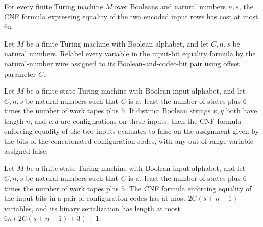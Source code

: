 \begin{theorem}
\label{Complexity.codecInputEquality_cost}
\leanok
{}
For every finite Turing machine $M$ over Booleans and natural numbers $n,s$, the CNF
formula expressing equality of the two encoded input rows has cost at most $6n$.
\end{theorem}

\begin{definition}
\label{Complexity.configurationInputEquality}
\leanok
{}
Let $M$ be a finite Turing machine with Boolean alphabet, and let $C,n,s$ be natural
numbers. Relabel every variable in the input-bit equality formula by the natural-number
wire assigned to its Boolean-and-codec-bit pair using offset parameter $C$.
\end{definition}

\begin{theorem}
\label{Complexity.configurationInputEquality_reject}
\leanok
{}
Let $M$ be a finite-state Turing machine with Boolean input alphabet, and let $C,n,s$ be
natural numbers such that $C$ is at least the number of states plus $6$ times the number
of work tapes plus $5$. If distinct Boolean strings $x,y$ both have length $n$, and
$c,d$ are configurations on these inputs, then the CNF formula enforcing equality of the
two inputs evaluates to false on the assignment given by the bits of the concatenated
configuration codes, with any out-of-range variable assigned false.
\end{theorem}

\begin{theorem}
\label{Complexity.configurationInputEquality_bounds}
\leanok
{}
Let $M$ be a finite-state Turing machine with Boolean input alphabet, and let $C,n,s$ be
natural numbers such that $C$ is at least the number of states plus $6$ times the number
of work tapes plus $5$. The CNF formula enforcing equality of the input bits in a pair
of configuration codes has at most $2C(s+n+1)$ variables, and its binary serialization
has length at most $6n(2C(s+n+1)+3)+1$.
\end{theorem}

